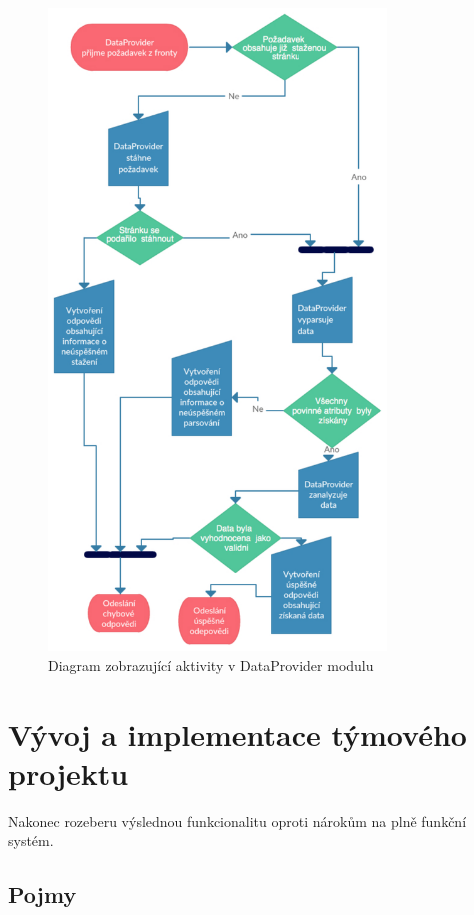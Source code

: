 \documentclass[thesis=B,czech]{FITthesis}[2012/06/26]
\begin{document}
\begin{figure}\centering
 	\includegraphics[width=0.8\textwidth]{resources/DataProvider-activity}
	\caption[DataProvider diagram]{Diagram zobrazující aktivity v DataProvider modulu}\label{fig:float}
\end{figure}

\chapter{Vývoj a implementace týmového projektu}

Nakonec rozeberu výslednou funkcionalitu oproti nárokům na plně funkční systém.
\section{Pojmy}
\end{document}
